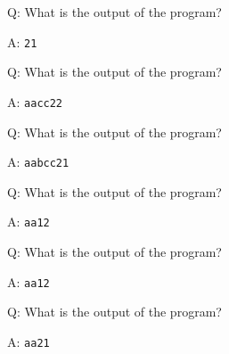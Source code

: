 \begin{frame}[fragile]{Q: What is the output of the program?}
\end{frame}

\begin{frame}[fragile]{A: \texttt{21}}
\end{frame}

\begin{frame}[fragile]{Q: What is the output of the program?}
\end{frame}

\begin{frame}[fragile]{A: \texttt{aacc22}}
\end{frame}

\begin{frame}[fragile]{Q: What is the output of the program?}
\end{frame}

\begin{frame}[fragile]{A: \texttt{aabcc21}}
\end{frame}

\begin{frame}[fragile]{Q: What is the output of the program?}
\end{frame}

\begin{frame}[fragile]{A: \texttt{aa12}}
\end{frame}

\begin{frame}[fragile]{Q: What is the output of the program?}
\end{frame}

\begin{frame}[fragile]{A: \texttt{aa12}}
\end{frame}

\begin{frame}[fragile]{Q: What is the output of the program?}
\end{frame}

\begin{frame}[fragile]{A: \texttt{aa21}}
\end{frame}

